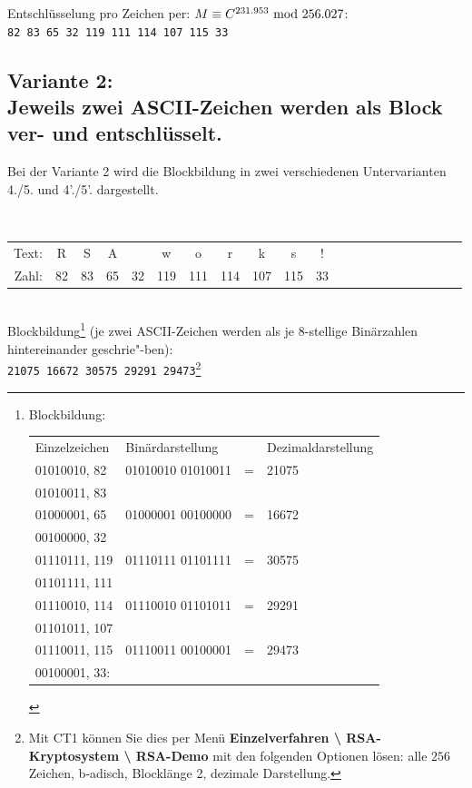 \begin{refsegment}
\noindent Entschlüsselung pro Zeichen per: $M \equiv C^{231.953}{\rm ~mod~}256.027$:\\
{\tt 82 83 65 32 119 111 114 107 115 33}\\


\subsection*{Variante 2:\\ Jeweils zwei ASCII-Zeichen werden als Block ver- und entschlüsselt.}

Bei der Variante 2 wird die Blockbildung in zwei verschiedenen Untervarianten 4./5. und 4'./5'. dargestellt.

{\tt
\begin{tabular}{rcccccccccccccccccccc}
{\rm Text:} & R & S & A &   & w & o & r & k & s & !\\
{\rm Zahl:} & 82 & 83 & 65 & 32 & 119 & 111 & 114 & 107 & 115 & 33
\end{tabular} } %

\\
Blockbildung\footnote{%
Blockbildung:\\ \tt \begin{tabular}{ll@{ }l@{ }l}
Einzelzeichen& Binärdarstellung  &&Dezimaldarstellung\\
01010010, 82 & 01010010 01010011 & = &21075\\
01010011, 83 &\\
01000001, 65 & 01000001 00100000 & = &16672\\
00100000, 32\\
01110111, 119 & 01110111 01101111 & = &30575\\
01101111, 111\\
01110010, 114 & 01110010 01101011 & = &29291\\
01101011, 107\\
01110011, 115 & 01110011 00100001 & = &29473\\
00100001, 33:
\end{tabular}
} (je zwei ASCII-Zeichen werden als je 8-stellige Binärzahlen hintereinander geschrie"-ben):\\
{\tt 21075 16672 30575 29291 29473}\footnote{%
Mit CT1 können Sie dies per Menü {\bf Einzelverfahren \textbackslash{}
RSA-Kryptosystem \textbackslash{} RSA-Demo} mit den folgenden Optionen lösen: alle
$256$ Zeichen, b-adisch, Blocklänge 2, dezimale Darstellung.
}


\end{refsegment}

